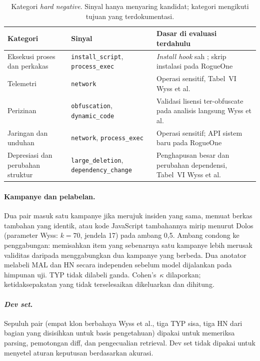 \documentclass[a4paper,fleqn]{cas-dc}
\begin{document}
\begin{table}[t]
\caption{Kategori \emph{hard negative}. Sinyal hanya menyaring kandidat;
kategori mengikuti tujuan yang terdokumentasi.}
\label{tab:hn}
\small
\begin{tabular}{p{2.2cm} p{2.0cm} p{3.4cm}}
\hline
Kategori & Sinyal & Dasar di evaluasi terdahulu \\
\hline
Eksekusi proses dan perkakas
  & \texttt{install\_script}, \texttt{process\_exec}
  & \emph{Install hook} sah \citep{guo2026effective}; skrip instalasi pada RogueOne \\
Telemetri
  & \texttt{network}
  & Operasi sensitif, Tabel~VI Wyss et al. \\
Perizinan
  & \texttt{obfuscation}, \texttt{dynamic\_code}
  & Validasi lisensi ter-obfuscate pada analisis langsung Wyss et al. \\
Jaringan dan unduhan
  & \texttt{network}, \texttt{process\_exec}
  & Operasi sensitif; API sistem baru pada RogueOne \\
Depresiasi dan perubahan struktur
  & \texttt{large\_deletion}, \texttt{dependency\_change}
  & Penghapusan besar dan perubahan dependensi, Tabel~VI Wyss et al. \\
\hline
\end{tabular}
\end{table}

\paragraph{Kampanye dan pelabelan.}
Dua pair masuk satu kampanye jika merujuk insiden yang sama, memuat berkas
tambahan yang identik, atau kode JavaScript tambahannya mirip menurut Dolos
(parameter Wyss: $k{=}70$, jendela 17) pada ambang 0,5. Ambang condong ke
penggabungan: memisahkan item yang sebenarnya satu kampanye lebih merusak
validitas daripada menggabungkan dua kampanye yang berbeda. Dua anotator
melabeli MAL dan HN secara independen sebelum model dijalankan pada himpunan
uji. TYP tidak dilabeli ganda. Cohen's~$\kappa$ dilaporkan; ketidaksepakatan
yang tidak terselesaikan dikeluarkan dan dihitung.

\paragraph{\emph{Dev set}.}
Sepuluh pair (empat klon berbahaya Wyss et al., tiga TYP sisa, tiga HN dari
bagian yang disisihkan untuk basis pengetahuan) dipakai untuk memeriksa
parsing, pemotongan diff, dan pengecualian retrieval. Dev set tidak dipakai
untuk menyetel aturan keputusan berdasarkan akurasi.
\end{document}
